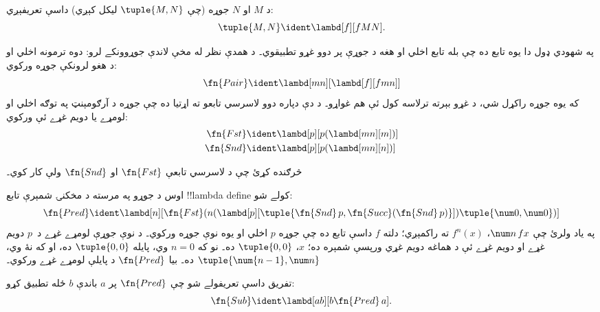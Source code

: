 \documentclass[../../../include/open-logic-section]{subfiles}
\begin{document}

\begin{defn}
د $M$ او $N$ جوړه (چې $\tuple{M,N}$ ليکل کېږي) داسې تعريفېږي:
\[
\tuple{M,N} \ident \lambd[f][fMN].
\]
\end{defn}
  
په شهودي ډول دا يوه تابع ده چې بله تابع اخلي او هغه
د جوړې پر دوو غړو تطبيقوي۔ د همدې نظر له مخې لاندې
جوړوونکے لرو: دوه ترمونه اخلي او د هغو لرونکې جوړه ورکوي:
\[
  \fn{Pair} \ident \lambd[mn][\lambd[f][fmn]]
\]
که يوه جوړه راکړل شي، د غړو بېرته ترلاسه کول ئې هم غواړو۔
د دې دپاره دوو لاسرسي تابعو ته اړتيا ده چې جوړه د آرګومېنټ
په توګه اخلي او لومړے يا دويم غړے ئې ورکوي:
\begin{align*}
  \fn{Fst} & \ident \lambd[p][p(\lambd[mn][m])]\\
  \fn{Snd} & \ident \lambd[p][p(\lambd[mn][n])]
\end{align*}

\begin{prob}
  څرګنده کړئ چې د لاسرسي تابعې $\fn{Fst}$ او $\fn{Snd}$
  ولې کار کوي۔
\end{prob}

اوس د جوړو په مرسته د مخکنۍ شمېرې تابع !!{lambda define}
کولے شو:
\[
  \fn{Pred} \ident \lambd[n][\fn{Fst}(n (\lambd[p][\tuple{\fn{Snd}\, {p}, \fn{Succ}(\fn{Snd}\, {p})}]) \tuple{\num 0, \num 0})]
\]
په ياد ولرئ چې $\num n\, f x$، $f^{n}(x)$ ته راکمېږي؛
دلته $f$ داسې تابع ده چې جوړه $p$ اخلي او يوه نوې جوړه
ورکوي۔ د نوې جوړې لومړے غړے د~$p$ دويم غړے او دويم
غړے ئې د هماغه دويم غړي ورپسې شمېره ده؛ $x$،
$\tuple{0,0}$ ده۔ نو که $n=0$ وي، پايله
$\tuple{0,0}$ ده، او که نۀ وي، $\tuple{\num{n-1}, \num n}$
ده۔ بيا $\fn{Pred}$ د پايلې لومړے غړے ورکوي۔

تفريق داسې تعريفولے شو چې $\fn{Pred}$ پر $a$ باندې
$b$ ځله تطبيق کړو:
\[
\fn{Sub} \ident \lambd[ab][b \fn{Pred}\, a].
\]
    
\end{document}
